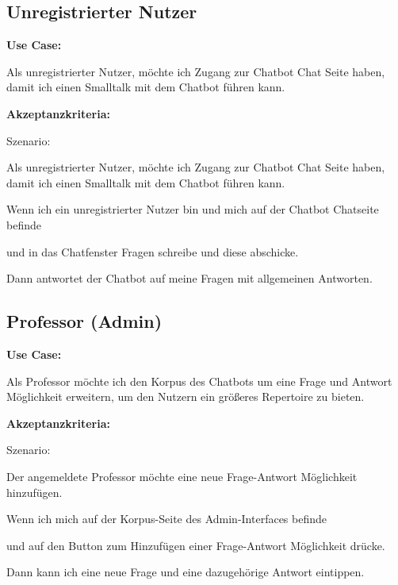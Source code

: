\newpage
\subsection{Unregistrierter Nutzer}

\textbf{Use Case:}
\newline

\noindent Als unregistrierter Nutzer,
möchte ich Zugang zur Chatbot Chat Seite haben,
damit ich einen Smalltalk mit dem Chatbot führen kann.
\newline

\noindent \textbf{Akzeptanzkriteria:}
\newline

\noindent Szenario: 

\noindent Als unregistrierter Nutzer,
möchte ich Zugang zur Chatbot Chat Seite haben,
damit ich einen Smalltalk mit dem Chatbot führen kann.
\newline

\noindent Wenn ich ein unregistrierter Nutzer bin und mich auf der Chatbot Chatseite befinde

\noindent und in das Chatfenster Fragen schreibe und diese abschicke.

\noindent Dann antwortet der Chatbot auf meine Fragen mit allgemeinen Antworten.

\subsection{Professor (Admin)}

\textbf{Use Case:}
\newline

\noindent Als Professor möchte ich den Korpus des Chatbots 
um eine Frage und Antwort Möglichkeit erweitern, 
um den Nutzern ein größeres Repertoire zu bieten.
\newline

\noindent \textbf{Akzeptanzkriteria:}
\newline

\noindent Szenario: 

\noindent Der angemeldete Professor möchte eine neue Frage-Antwort Möglichkeit hinzufügen.
\newline

\noindent Wenn ich mich auf der Korpus-Seite des Admin-Interfaces befinde

\noindent und auf den Button zum Hinzufügen einer Frage-Antwort Möglichkeit drücke.

\noindent Dann kann ich eine neue Frage und eine dazugehörige Antwort eintippen.




